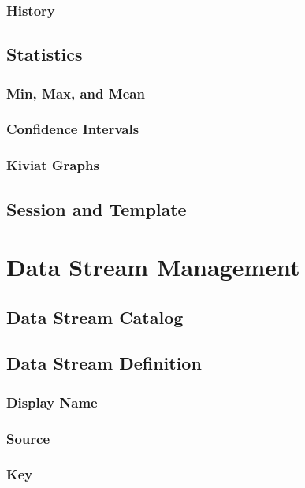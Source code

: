 \subsubsection{History}

\subsection{Statistics}

\subsubsection{Min, Max, and Mean}

\subsubsection{Confidence Intervals}

\subsubsection{Kiviat Graphs}

\subsection{Session and Template}

\section{Data Stream Management}

\subsection{Data Stream Catalog}

\subsection{Data Stream Definition}

\subsubsection{Display Name}
\subsubsection{Source}
\subsubsection{Key}

